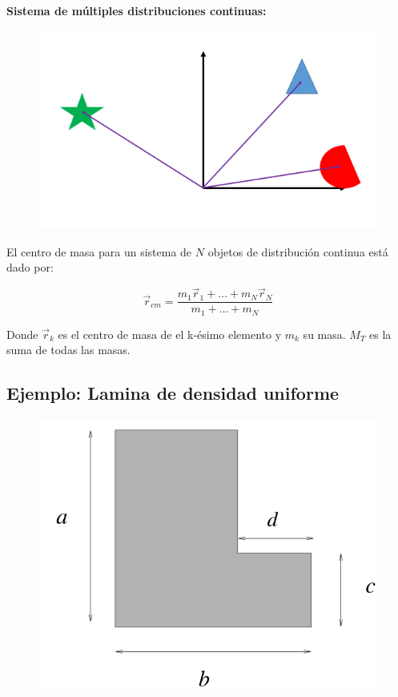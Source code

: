 \documentclass[a4paper,11pt]{article}
\begin{document}
\textbf{Sistema de múltiples distribuciones continuas:}\\



\begin{figure}
	\includegraphics[scale=0.5]{./im/muchos3d}
\end{figure}

El centro de masa para un sistema de $N$ objetos de distribución continua está dado por:

\begin{equation}
 \vec{r}_{cm} = \frac{m_1\vec{r}_1 + \dots + m_N \vec{r}_N}{m_1 + \dots + m_N}
\end{equation}



Donde $ \vec{r}_k$ es el centro de masa de el k-ésimo elemento y $m_k$ su masa. $M_T$ es la suma de todas las masas.


\subsection{Ejemplo: Lamina de densidad uniforme} 


\begin{figure}
	\includegraphics[scale=0.5]{./im/4}
\end{figure}
\end{document}

